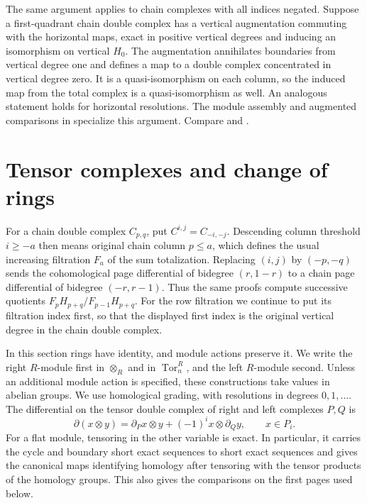 The same argument applies to chain complexes with all indices
negated. Suppose a first-quadrant chain double complex has a vertical
augmentation commuting with the horizontal maps, exact in positive
vertical degrees and inducing an isomorphism on vertical \(H_0\).
The augmentation annihilates boundaries from vertical degree one
and defines a map to a double complex concentrated in vertical
degree zero. It is a quasi-isomorphism on each column, so the induced
map from the total complex is a quasi-isomorphism as well.
An analogous statement holds
for horizontal resolutions. The module assembly and augmented
comparisons in \cite[Chapter 10]{p103} specialize this argument. Compare
\cite[Lemmas 12.25.1, 12.25.3, and 12.25.4]{stacks-homology} and
\cite[Exercise 5.6.4]{weibel}.

\section{Tensor complexes and change of rings}

For a chain double complex \(C_{p,q}\), put \(C^{i,j}=C_{-i,-j}\).
Descending column threshold \(i\ge -a\) then means original chain
column \(p\le a\), which defines the usual increasing filtration
\(F_a\) of the sum totalization. Replacing \((i,j)\) by \((-p,-q)\)
sends the cohomological page differential of bidegree
\((r,1-r)\) to a chain page differential of bidegree \((-r,r-1)\).
Thus the same proofs compute successive quotients
\(F_pH_{p+q}/F_{p-1}H_{p+q}\). For the row filtration we continue to put
its filtration index first, so that the displayed first index is the
original vertical degree in the chain double complex.

In this section rings have identity, and module actions preserve it.
We write the right \(R\)-module first in \(\otimes_R\) and in
\(\operatorname{Tor}^R_n\), and the left \(R\)-module second. Unless an
additional module action is specified, these constructions take values
in abelian groups. We use homological grading, with resolutions in
degrees \(0,1,\ldots\). The differential on the tensor double complex
of right and left complexes \(P,Q\) is
\[
   \partial(x\otimes y)=\partial_P x\otimes y
            +(-1)^i x\otimes\partial_Q y,\qquad x\in P_i.
\]
For a flat module, tensoring in the other variable is exact. In
particular, it carries the cycle and boundary short exact sequences to
short exact sequences and gives the canonical maps identifying
homology after tensoring with the tensor products of the homology
groups. This also gives the comparisons on the first pages used below.

